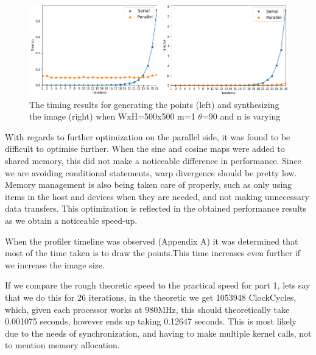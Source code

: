 \begin{figure}
	\includegraphics[width=.95\linewidth]{Images/timing.png}
	\centering
	\caption{The timing results for generating the points (left) and synthesizing the image (right) when WxH=500x500 m=1 $\theta$=90 and n is varying}
	\label{fig:timing}
\end{figure}

With regards to further optimization on the parallel side, it was found to be difficult to optimise further. When the sine and cosine maps were added to shared memory, this did not make a noticeable difference in performance. Since we are avoiding conditional statements, warp divergence should be pretty low. Memory management is also being taken care of properly, such as only using items in the host and devices when they are needed, and not making unnecessary data transfers. This optimization is reflected in the obtained performance results as we obtain a noticeable speed-up.

When the profiler timeline was observed (Appendix A) it was determined that most of the time taken is to draw the points.This time increases even further if we increase the image size.

If we compare the rough theoretic speed to the practical speed for part 1, lets say that we do this for 26 iterations, in the theoretic we get 1053948 ClockCycles, which, given each processor works at 980MHz, this should theoretically take 0.001075 seconds, however ends up taking 0.12647 seconds. This is most likely due to the needs of synchronization, and having to make multiple kernel calls, not to mention memory allocation.